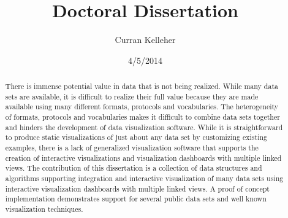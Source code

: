 \documentclass[12pt]{article}
\title{Doctoral Dissertation}
\author{Curran Kelleher}
\date{4/5/2014}
\begin{document}
\maketitle 

\begin{onehalfspacing}
\begin{abstract}
There is immense potential value in data that is not being realized. While many data sets are available, it is difficult to realize their full value because they are made available using many different formats, protocols and vocabularies. The heterogeneity of formats, protocols and vocabularies makes it difficult to combine data sets together and hinders the development of data visualization software. While it is straightforward to produce static visualizations of just about any data set by customizing existing examples, there is a lack of generalized visualization software that supports the creation of interactive visualizations and visualization dashboards with multiple linked views. The contribution of this dissertation is a collection of data structures and algorithms supporting integration and interactive visualization of many data sets using interactive visualization dashboards with multiple linked views. A proof of concept implementation demonstrates support for several public data sets and well known visualization techniques.
\end{abstract}
\end{onehalfspacing}

\pagebreak

\tableofcontents

\pagebreak
\end{document}
